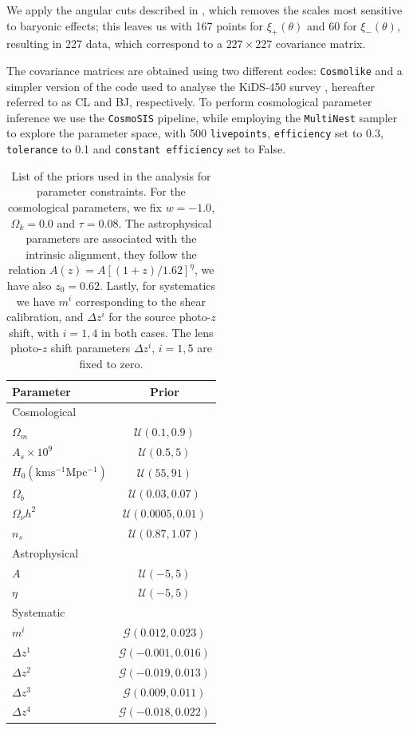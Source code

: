 \documentclass[twocolumn]{\docclass}
\begin{document}
	We apply the angular cuts described in \citep{Abbott:2018cms}, which removes the scales most sensitive to baryonic effects; this leaves us with 167 points for $\xi_+(\theta)$ and 60 for $\xi_-(\theta)$, resulting in 227 data, which correspond to a $227 \times 227$ covariance matrix.
	
	The covariance matrices are obtained using two different codes: {\tt Cosmolike} \citep{Krause:2016jvl} and a simpler version of the code used to analyse the KiDS-450 survey \citep{Kohlinger:2017sxk}, hereafter referred to as CL and BJ, respectively. To perform cosmological parameter inference we use the {\tt CosmoSIS} \citep{Zuntz:2015med} pipeline, while employing the {\tt MultiNest} \citep{Feroz:2009fhb} sampler to explore the parameter space, with 500 {\tt livepoints}, {\tt efficiency} set to 0.3, {\tt tolerance} to 0.1 and {\tt constant efficiency} set to False.
	
	\begin{table}
		\centering
		\begin{tabular} { l c} 
			\hline
			\hline
			Parameter							& Prior	\\ \hline
			Cosmological & \\ [1ex]
			$\Omega_m$						& $\mathcal{U}(0.1, 0.9)$		\\
			$A_s \times 10^9$					& $\mathcal{U}(0.5, 5)$		\\
			$H_0 \mathrm{(km s^{-1} Mpc^{-1})}$	& $\mathcal{U}(55, 91)$		\\
			$\Omega_b$						& $\mathcal{U}(0.03, 0.07)$	\\
			$\Omega_\nu h^2$					& $\mathcal{U}(0.0005, 0.01)$	\\
			$n_s$							& $\mathcal{U}(0.87, 1.07)$	\\ [1ex]
			\hline
			Astrophysical & \\ [1ex]
			$A$								& $\mathcal{U}(-5, 5)$ \\
			$\eta$							& $\mathcal{U}(-5, 5)$ \\ [1ex]
			\hline
			Systematic & \\ [1ex]
			$m^i$							& $\mathcal{G}(0.012, 0.023)$	 \\
			$\Delta z^1$						& $\mathcal{G}(-0.001, 0.016)$	 \\
			$\Delta z^2$						& $\mathcal{G}(-0.019, 0.013)$	 \\
			$\Delta z^3$						& $\mathcal{G}(0.009, 0.011)$	 \\
			$\Delta z^4$						& $\mathcal{G}(-0.018, 0.022)$	 \\ [1ex]
			\hline
			\hline
		\end{tabular}
		\caption{List of the priors used in the analysis for parameter constraints. For the cosmological parameters, we fix $w = -1.0$, $\Omega_k =  0.0$ and $\tau =  0.08$. The astrophysical parameters are associated with the intrinsic alignment, they follow the relation $A(z) = A[(1+z)/1.62]^{\eta}$, we have also $z_0 = 0.62$. Lastly, for systematics we have $m^i$ corresponding to the shear calibration, and  $\Delta z^i$ for the source photo-$z$ shift, with $i = 1, 4$ in both cases. The lens photo-$z$ shift parameters $\Delta z^i$, $i = 1, 5$ are fixed to zero.}
		\label{tab:constraints}
	\end{table}
	
\end{document}
